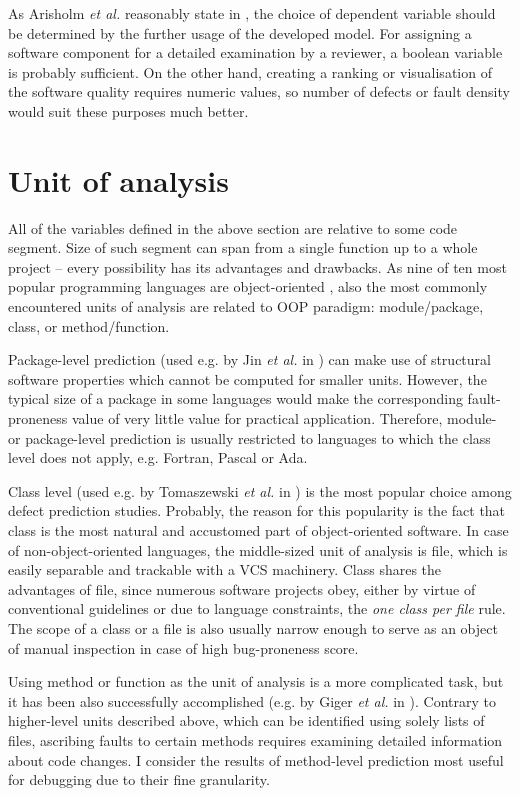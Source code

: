 \documentclass{pracamgr}
\begin{document}
As Arisholm \textit{et al.} reasonably state in \cite[p. 5]{systematic}, the choice of dependent variable should be determined by the further usage of the developed model. For assigning a software component for a detailed examination by a reviewer, a boolean variable is probably sufficient. On the other hand, creating a ranking or visualisation of the software quality requires numeric values, so number of defects or fault density would suit these purposes much better.

\section{Unit of analysis}
\label{sec:unit_of_analysis}
All of the variables defined in the above section are relative to some code segment. Size of such segment can span from a single function up to a whole project -- every possibility has its advantages and drawbacks. As nine of ten most popular programming languages are object-oriented \cite{popularity1,popularity2}, also the most commonly encountered units of analysis are related to OOP paradigm: module/package, class, or method/function.

Package-level prediction (used e.g. by Jin \textit{et al.} in \cite{Jin}) can make use of structural software properties which cannot be computed for smaller units. However, the typical size of a package in some languages would make the corresponding fault-proneness value of very little value for practical application. Therefore, module- or package-level prediction is usually restricted to languages to which the class level does not apply, e.g. Fortran, Pascal or Ada.

Class level (used e.g. by Tomaszewski \textit{et al.} in \cite{Tomaszewski}) is the most popular choice among defect prediction studies. Probably, the reason for this popularity is the fact that class is the most natural and accustomed part of object-oriented software. In case of non-object-oriented languages, the middle-sized unit of analysis is file, which is easily separable and trackable with a VCS machinery. Class shares the advantages of file, since numerous software projects obey, either by virtue of conventional guidelines or due to language constraints, the \emph{one class per file} rule. The scope of a class or a file is also usually narrow enough to serve as an object of manual inspection in case of high bug-proneness score.

Using method or function as the unit of analysis is a more complicated task, but it has been also successfully accomplished (e.g. by Giger \textit{et al.} in \cite{method-level}). Contrary to higher-level units described above, which can be identified using solely lists of files, ascribing faults to certain methods requires examining detailed information about code changes. I consider the results of method-level prediction most useful for debugging due to their fine granularity.
\end{document}
